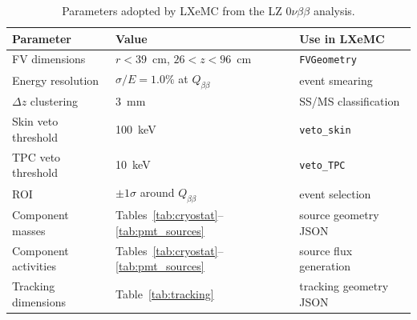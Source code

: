 \documentclass[11pt]{article}
\begin{document}
\begin{table}[h]
\centering
\caption{Parameters adopted by LXeMC from the LZ $0\nu\beta\beta$
  analysis.}
\label{tab:lxemc}
\begin{tabular}{@{}lll@{}}
\toprule
Parameter & Value & Use in LXeMC \\
\midrule
FV dimensions & $r < 39$~cm, $26 < z < 96$~cm & \texttt{FVGeometry} \\
Energy resolution & $\sigma/E = 1.0\%$ at $Q_{\beta\beta}$ & event smearing \\
$\Delta z$ clustering & 3~mm & SS/MS classification \\
Skin veto threshold & 100~keV & \texttt{veto\_skin} \\
TPC veto threshold & 10~keV & \texttt{veto\_TPC} \\
ROI & $\pm 1\sigma$ around $Q_{\beta\beta}$ & event selection \\
Component masses & Tables~\ref{tab:cryostat}--\ref{tab:pmt_sources} & source geometry JSON \\
Component activities & Tables~\ref{tab:cryostat}--\ref{tab:pmt_sources} & source flux generation \\
Tracking dimensions & Table~\ref{tab:tracking} & tracking geometry JSON \\
\bottomrule
\end{tabular}
\end{table}
\end{document}
